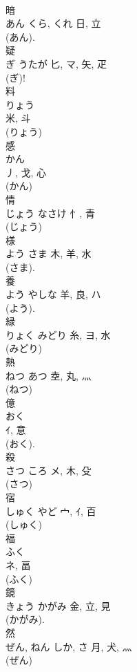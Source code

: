 \documentclass[8pt]{extreport}
\begin{document}
\begin{CJK}{UTF8}{min}
\\	暗	
\\	あん	くら, くれ	日, 立	
\\	(あん). 
\\	疑	
\\	ぎ	うたが	匕, マ, 矢, 疋	
\\	(ぎ)! 
\\	料	
\\	りょう	
\\	米, 斗	
\\	(りょう) 
\\	感	
\\	かん	
\\	丿, 戈, 心		
\\	(かん) 
\\	情	
\\	じょう	なさけ	忄, 青	
\\	(じょう) 
\\	様	
\\	よう	さま	木, 羊, 水	
\\	(さま). 
\\	養	
\\	よう	やしな	羊, 良, ハ	
\\	(よう). 
\\	緑	
\\	りょく	みどり	糸, ヨ, 水	
\\	(みどり) 
\\	熱	
\\	ねつ	あつ	坴, 丸, 灬	
\\	(ねつ) 
\\	億	
\\	おく	
\\	ｲ, 意	
\\	(おく). 
\\	殺	
\\	さつ	ころ	メ, 木, 殳	
\\	(さつ) 
\\	宿	
\\	しゅく	やど	宀, ｲ, 百	
\\	(しゅく) 
\\	福	
\\	ふく	
\\	ネ, 畐	
\\	(ふく) 
\\	鏡	
\\	きょう	かがみ	金, 立, 見	
\\	(かがみ). 
\\	然	
\\	ぜん, ねん	しか, さ	月, 犬, 灬	
\\	(ぜん) 

\end{CJK}
\end{document}
